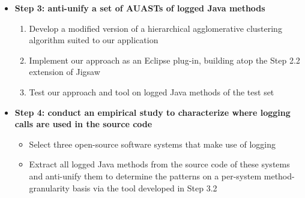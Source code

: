 \documentclass{article}
\newcommand{\cmark}{\ding{51}}%
\newcommand{\pmark}{\ding{59}}%
\newcommand{\bld}{\textbf}
\begin{document}
\begin{itemize} [leftmargin=.1in]
\begin{itemize} [leftmargin=.1in]
 

\item \bld{Step 3: anti-unify a set of AUASTs of logged Java methods}
\begin{enumerate}
\item Develop a modified version of a hierarchical agglomerative clustering algorithm suited to our application \cmark 
\item Implement our approach  as an Eclipse plug-in, building atop the Step 2.2 extension of Jigsaw \cmark 
\item Test our approach and tool on logged Java methods of the test set \cmark   %


\end{enumerate} 

\item \bld{Step 4: conduct an empirical study to characterize where logging calls are used in the source code} \pmark {}
\begin{itemize} 
\item Select three open-source software systems that make use of logging \cmark 
\item Extract all logged Java methods from the source code of these systems and anti-unify them to determine the patterns on a per-system method-granularity basis via the tool developed in Step 3.2
\pmark {}
\end{itemize}
\end{itemize}



\end{itemize}
\end{document}
